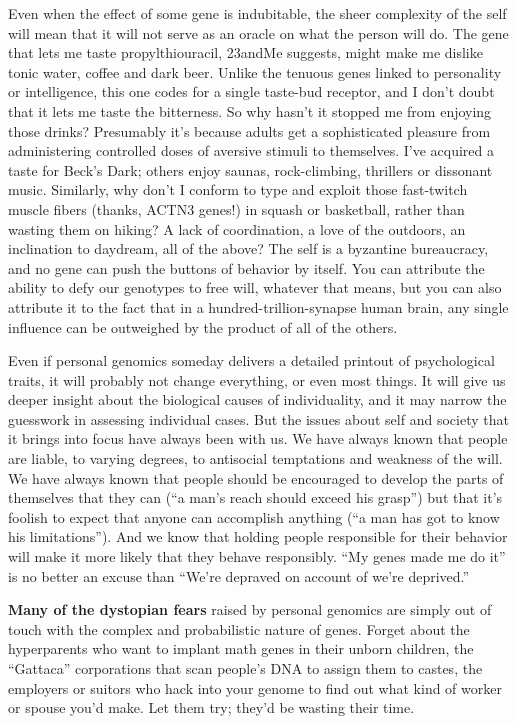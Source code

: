 Even when the effect of some gene is indubitable, the sheer complexity
of the self will mean that it will not serve as an oracle on what the
person will do. The gene that lets me taste propyl­thiouracil, 23andMe
suggests, might make me dislike tonic water, coffee and dark beer.
Unlike the tenuous genes linked to personality or intelligence, this one
codes for a single taste-bud receptor, and I don't doubt that it lets me
taste the bitterness. So why hasn't it stopped me from enjoying those
drinks? Presumably it's because adults get a sophisticated pleasure from
administering controlled doses of aversive stimuli to themselves. I've
acquired a taste for Beck's Dark; others enjoy saunas, rock-climbing,
thrillers or dissonant music. Similarly, why don't I conform to type and
exploit those fast-twitch muscle fibers (thanks, ACTN3 genes!) in squash
or basketball, rather than wasting them on hiking? A lack of
coordination, a love of the outdoors, an inclination to daydream, all of
the above? The self is a byzantine bureaucracy, and no gene can push the
buttons of behavior by itself. You can attribute the ability to defy our
genotypes to free will, whatever that means, but you can also attribute
it to the fact that in a hundred-trillion-synapse human brain, any
single influence can be outweighed by the product of all of the others.

Even if personal genomics someday delivers a detailed printout of
psychological traits, it will probably not change everything, or even
most things. It will give us deeper insight about the biological causes
of individuality, and it may narrow the guesswork in assessing
individual cases. But the issues about self and society that it brings
into focus have always been with us. We have always known that people
are liable, to varying degrees, to antisocial temptations and weakness
of the will. We have always known that people should be encouraged to
develop the parts of themselves that they can (``a man's reach should
exceed his grasp'') but that it's foolish to expect that anyone can
accomplish anything (``a man has got to know his limitations''). And we
know that holding people responsible for their behavior will make it
more likely that they behave responsibly. ``My genes made me do it'' is
no better an excuse than ``We're depraved on account of we're
deprived.''

\textbf{Many of the dystopian fears} raised by personal genomics are
simply out of touch with the complex and probabilistic nature of genes.
Forget about the hyperparents who want to implant math genes in their
unborn children, the ``Gattaca'' corporations that scan people's DNA to
assign them to castes, the employers or suitors who hack into your
genome to find out what kind of worker or spouse you'd make. Let them
try; they'd be wasting their time.


